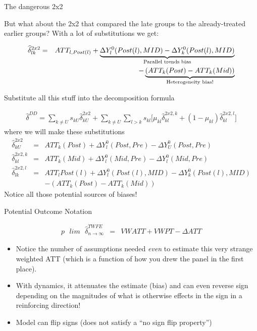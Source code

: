 \documentclass{beamer}
\begin{document}
\begin{frame}{The dangerous 2x2}

But what about the 2x2 that compared the late groups to the already-treated earlier groups? With a lot of substitutions we get:

\begin{eqnarray*}
\widehat{\delta}^{2x2}_{lk} &=& ATT_{l,Post(l)} + \underbrace{\Delta Y^0_l(Post(l),MID) - \Delta Y^0_k ( Post(l), MID)}_{\mathclap{\text{Parallel trends bias}}} \\
&& - \underbrace{(ATT_k(Post) - ATT_k(Mid))}_{\mathclap{\text{Heterogeneity bias!}}}
\end{eqnarray*}


\end{frame}

\begin{frame}{Substitute all this stuff into the decomposition formula}

\begin{eqnarray*}	
\widehat{\delta}^{DD} = \sum_{k \neq U} s_{kU}\widehat{\delta}_{kU}^{2x2} + \sum_{k \neq U} \sum_{l>k} s_{kl}  \bigg [ \mu_{kl}\widehat{\delta}_{kl}^{2x2,k} + (1-\mu_{kl}) \widehat{\delta}_{kl}^{2x2,l} \bigg]
\end{eqnarray*}where we will make these substitutions\begin{eqnarray*}
\widehat{\delta}_{kU}^{2x2} &=& ATT_k(Post) + \Delta Y_l^0(Post,Pre) - \Delta Y_U^0(Post, Pre) \\
\widehat{\delta}_{kl}^{2x2,k} &=& ATT_k(Mid) + \Delta Y_l^0(Mid,Pre) - \Delta Y_l^0(Mid, Pre) \\
\widehat{\delta}^{2x2,l}_{lk} &=& ATT_{l}Post(l) + \Delta Y^0_l(Post(l),MID) - \Delta Y^0_k ( Post(l), MID) \\
&&- (ATT_k(Post) - ATT_k(Mid))
\end{eqnarray*}Notice all those potential sources of biases! 

\end{frame}


\begin{frame}{Potential Outcome Notation}

\begin{eqnarray*}
p\text{ }lim\text{ } \widehat{\delta}^{TWFE}_{n\to\infty} &=& VWATT + VWPT - \Delta ATT
\end{eqnarray*}

\begin{itemize}
\item Notice the number of assumptions needed \emph{even} to estimate this very strange weighted ATT (which is a function of how you drew the panel in the first place). 
\item With dynamics, it attenuates the estimate (bias) and can even reverse sign depending on the magnitudes of what is otherwise effects in the sign in a reinforcing direction! 
\item Model can flip signs (does not satisfy a ``no sign flip property'')
\end{itemize}

\end{frame}
\end{document}
